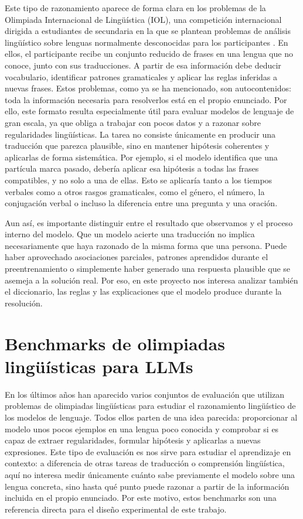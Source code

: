 Este tipo de razonamiento aparece de forma clara en los problemas de la Olimpiada Internacional de Lingüística (IOL), una competición internacional dirigida a estudiantes de secundaria en la que se plantean problemas de análisis lingüístico sobre lenguas normalmente desconocidas para los participantes \citep{derzhanski2010linguistics,iol2026problems}. En ellos, el participante recibe un conjunto reducido de frases en una lengua que no conoce, junto con sus traducciones. A partir de esa información debe deducir vocabulario, identificar patrones gramaticales y aplicar las reglas inferidas a nuevas frases. Estos problemas, como ya se ha mencionado, son autocontenidos: toda la información necesaria para resolverlos está en el propio enunciado. Por ello, este formato resulta especialmente útil para evaluar modelos de lenguaje de gran escala, ya que obliga a trabajar con pocos datos y a razonar sobre regularidades lingüísticas. La tarea no consiste únicamente en producir una traducción que parezca plausible, sino en mantener hipótesis coherentes y aplicarlas de forma sistemática. Por ejemplo, si el modelo identifica que una partícula marca pasado, debería aplicar esa hipótesis a todas las frases compatibles, y no solo a una de ellas. Esto se aplicaría tanto a los tiempos verbales como a otros rasgos gramaticales, como el género, el número, la conjugación verbal o incluso la diferencia entre una pregunta y una oración.

Aun así, es importante distinguir entre el resultado que observamos y el proceso interno del modelo. Que un modelo acierte una traducción no implica necesariamente que haya razonado de la misma forma que una persona. Puede haber aprovechado asociaciones parciales, patrones aprendidos durante el preentrenamiento o simplemente haber generado una respuesta plausible que se asemeja a la solución real. Por eso, en este proyecto nos interesa analizar también el diccionario, las reglas y las explicaciones que el modelo produce durante la resolución.

\section{Benchmarks de olimpiadas lingüísticas para LLMs}
\label{sec:benchmarks}

En los últimos años han aparecido varios conjuntos de evaluación que utilizan problemas de olimpiadas lingüísticas para estudiar el razonamiento lingüístico de los modelos de lenguaje. Todos ellos parten de una idea parecida: proporcionar al modelo unos pocos ejemplos en una lengua poco conocida y comprobar si es capaz de extraer regularidades, formular hipótesis y aplicarlas a nuevas expresiones. Este tipo de evaluación es nos sirve para estudiar el aprendizaje en contexto: a diferencia de otras tareas de traducción o comprensión lingüística, aquí no interesa medir únicamente cuánto sabe previamente el modelo sobre una lengua concreta, sino hasta qué punto puede razonar a partir de la información incluida en el propio enunciado. Por este motivo, estos benchmarks son una referencia directa para el diseño experimental de este trabajo.

